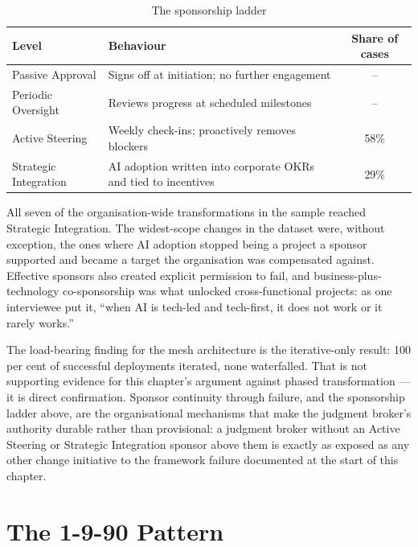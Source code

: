 \begin{table}[h]
\centering
\caption{The sponsorship ladder \parencite{Pereira2026Playbook}}
\label{tab:playbook-sponsorship}
\begin{tabularx}{\textwidth}{l X c}
\toprule
\textbf{Level} & \textbf{Behaviour} & \textbf{Share of cases} \\
\midrule
Passive Approval & Signs off at initiation; no further engagement & -- \\
\addlinespace
Periodic Oversight & Reviews progress at scheduled milestones & -- \\
\addlinespace
Active Steering & Weekly check-ins; proactively removes blockers & 58\% \\
\addlinespace
Strategic Integration & AI adoption written into corporate OKRs and tied to incentives & 29\% \\
\bottomrule
\end{tabularx}
\end{table}

All seven of the organisation-wide transformations in the sample reached Strategic Integration. The widest-scope changes in the dataset were, without exception, the ones where AI adoption stopped being a project a sponsor supported and became a target the organisation was compensated against. Effective sponsors also created explicit permission to fail, and business-plus-technology co-sponsorship was what unlocked cross-functional projects: as one interviewee put it, ``when AI is tech-led and tech-first, it does not work or it rarely works.''

\begin{keyinsight}
The load-bearing finding for the mesh architecture is the iterative-only result: 100 per cent of successful deployments iterated, none waterfalled. That is not supporting evidence for this chapter's argument against phased transformation --- it is direct confirmation. Sponsor continuity through failure, and the sponsorship ladder above, are the organisational mechanisms that make the judgment broker's authority durable rather than provisional: a judgment broker without an Active Steering or Strategic Integration sponsor above them is exactly as exposed as any other change initiative to the framework failure documented at the start of this chapter.
\end{keyinsight}

\section{The 1-9-90 Pattern}

